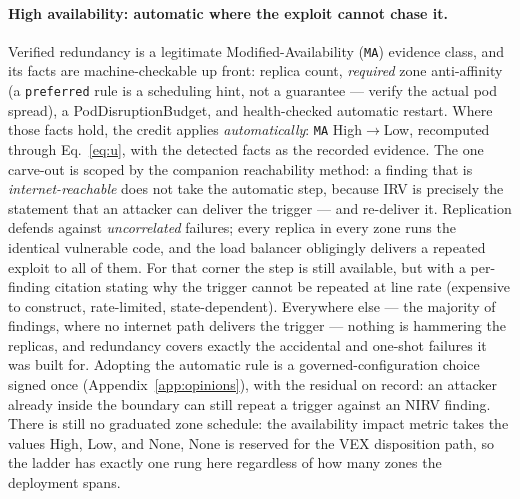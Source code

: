 \documentclass[11pt]{article}
\newcommand{\code}[1]{\texttt{#1}}
\begin{document}
\paragraph{High availability: automatic where the exploit cannot chase it.}
Verified redundancy is a legitimate Modified-Availability (\code{MA}) evidence
class, and its facts are machine-checkable up front: replica count, \emph{required}
zone anti-affinity (a \code{preferred} rule is a scheduling hint, not a guarantee
--- verify the actual pod spread), a PodDisruptionBudget, and health-checked
automatic restart. Where those facts hold, the credit applies
\emph{automatically}: \code{MA} High$\rightarrow$Low, recomputed through
Eq.~\eqref{eq:u}, with the detected facts as the recorded evidence. The one
carve-out is scoped by the companion reachability method: a finding that is
\emph{internet-reachable} does not take the automatic step, because IRV is
precisely the statement that an attacker can deliver the trigger --- and
re-deliver it. Replication defends against \emph{uncorrelated} failures; every
replica in every zone runs the identical vulnerable code, and the load balancer
obligingly delivers a repeated exploit to all of them. For that corner the step
is still available, but with a per-finding citation stating why the trigger
cannot be repeated at line rate (expensive to construct, rate-limited,
state-dependent). Everywhere else --- the majority of findings, where no internet
path delivers the trigger --- nothing is hammering the replicas, and redundancy
covers exactly the accidental and one-shot failures it was built for. Adopting
the automatic rule is a governed-configuration choice signed once
(Appendix~\ref{app:opinions}), with the residual on record: an attacker already
inside the boundary can still repeat a trigger against an NIRV finding. There is
still no graduated zone schedule: the availability impact metric takes the values
High, Low, and None, None is reserved for the VEX disposition path, so the ladder
has exactly one rung here regardless of how many zones the deployment spans.
\end{document}
